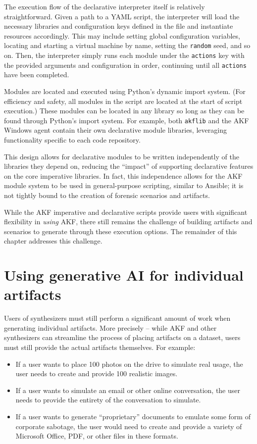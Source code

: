 The execution flow of the declarative interpreter itself is relatively
straightforward. Given a path to a YAML script, the interpreter will
load the necessary libraries and configuration keys defined in the file
and instantiate resources accordingly. This may include setting global
configuration variables, locating and starting a virtual machine by
name, setting the \passthrough{\lstinline!random!} seed, and so on.
Then, the interpreter simply runs each module under the
\passthrough{\lstinline!actions!} key with the provided arguments and
configuration in order, continuing until all
\passthrough{\lstinline!actions!} have been completed.

Modules are located and executed using Python's dynamic import system.
(For efficiency and safety, all modules in the script are located at the
start of script execution.) These modules can be located in any library
so long as they can be found through Python's import system. For
example, both \passthrough{\lstinline!akflib!} and the AKF Windows agent
contain their own declarative module libraries, leveraging functionality
specific to each code repository.

This design allows for declarative modules to be written independently
of the libraries they depend on, reducing the ``impact'' of supporting
declarative features on the core imperative libraries. In fact, this
independence allows for the AKF module system to be used in
general-purpose scripting, similar to Ansible; it is not tightly bound
to the creation of forensic scenarios and artifacts.

While the AKF imperative and declarative scripts provide users with
significant flexibility in \emph{using} AKF, there still remains the
challenge of building artifacts and scenarios to generate through these
execution options. The remainder of this chapter addresses this
challenge.

\section{Using generative AI for individual
artifacts}\label{using-generative-ai-for-individual-artifacts}

Users of synthesizers must still perform a significant amount of work
when generating individual artifacts. More precisely -- while AKF and
other synthesizers can streamline the process of placing artifacts on a
dataset, users must still provide the actual artifacts themselves. For
example:

\begin{itemize}
\tightlist
\item
  If a user wants to place 100 photos on the drive to simulate real
  usage, the user needs to create and provide 100 realistic images.
\item
  If a user wants to simulate an email or other online conversation, the
  user needs to provide the entirety of the conversation to simulate.
\item
  If a user wants to generate ``proprietary'' documents to emulate some
  form of corporate sabotage, the user would need to create and provide
  a variety of Microsoft Office, PDF, or other files in these formats.
\end{itemize}

